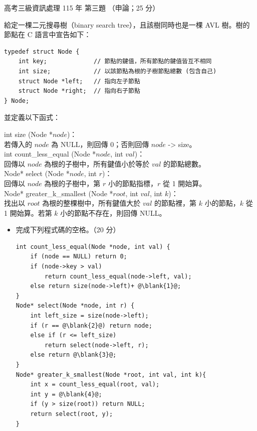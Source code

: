 \begin{pastexam}[label={px:gk3-115-ds-03}]{高考三級資訊處理 115 年 第三題}
（申論；25 分）

給定一棵二元搜尋樹（binary search tree），且該樹同時也是一棵 AVL 樹。樹的節點在 C 語言中宣告如下：
\begin{verbatim}
typedef struct Node {
    int key;             // 節點的鍵值，所有節點的鍵值皆互不相同
    int size;            // 以該節點為根的子樹節點總數 (包含自己)
    struct Node *left;   // 指向左子節點
    struct Node *right;  // 指向右子節點
} Node;
\end{verbatim}
並定義以下函式：

int size (Node *$node$)：\\
\hspace*{1.5em}若傳入的 $node$ 為 NULL，則回傳 0；否則回傳 $node$ -> size。\\
int count\_less\_equal (Node *$node$, int $val$)：\\
\hspace*{1.5em}回傳以 $node$ 為根的子樹中，所有鍵值小於等於 $val$ 的節點總數。\\
Node* select (Node *$node$, int $r$)：\\
\hspace*{1.5em}回傳以 $node$ 為根的子樹中，第 $r$ 小的節點指標，$r$ 從 1 開始算。\\
Node* greater\_k\_smallest (Node *$root$, int $val$, int $k$)：\\
\hspace*{1.5em}找出以 $root$ 為根的整棵樹中，所有鍵值大於 $val$ 的節點裡，第 $k$ 小的節點，$k$ 從 1 開始算。若第
$k$ 小的節點不存在，則回傳 NULL。
\begin{itemize}[leftmargin=2.2em]
\item[㈠] 完成下列程式碼的空格。（20 分）
\begin{verbatim}
int count_less_equal(Node *node, int val) {
    if (node == NULL) return 0;
    if (node->key > val)
        return count_less_equal(node->left, val);
    else return size(node->left)+ @\blank{1}@;
}
Node* select(Node *node, int r) {
    int left_size = size(node->left);
    if (r == @\blank{2}@) return node;
    else if (r <= left_size)
        return select(node->left, r);
    else return @\blank{3}@;
}
Node* greater_k_smallest(Node *root, int val, int k){
    int x = count_less_equal(root, val);
    int y = @\blank{4}@;
    if (y > size(root)) return NULL;
    return select(root, y);
}
\end{verbatim}

\end{itemize}
\end{pastexam}
